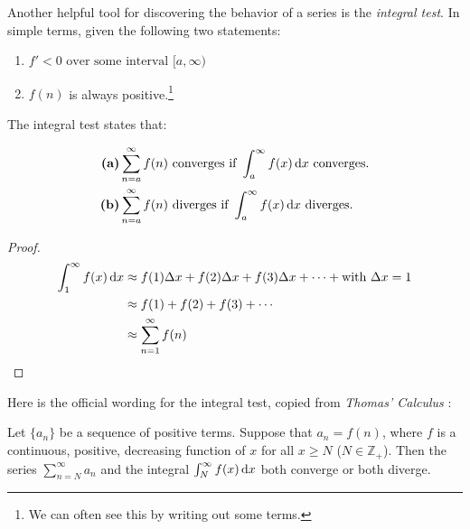 Another helpful tool for discovering the behavior of a series is the
\emph{integral test}.
In simple terms, given the following two statements:
\begin{enumerate}
  \item \(f' < 0 \text{ over some interval } [a, \infty) \)
    \item \(f(n)\) is always positive.\footnote{We can often see this by writing out some terms.}
\end{enumerate}
The integral test states that:

\begin{align*}
  \text{\textbf{(a)}} & \sum^\infty_{n=a} f(n) \text{ converges if }
  \int_{a}^{\infty} f(x) \,\mathrm{d} x \text{ converges.}  \\
  \text{\textbf{(b)}} & \sum^\infty_{n=a} f(n) \text{ diverges if } \int_{a}^{\infty} f(x) \,\mathrm{d} x \text{ diverges.}
\end{align*}

\begin{proof}
  \begin{align*}
    \int^\infty_1 f(x) \,\mathrm{d} x
    &\approx f(1) \Delta x + f(2) \Delta x + f(3) \Delta x + \cdots + \text{with } \Delta x = 1 \\
    &\approx f(1) + f(2)+f(3)+\cdots \\
    &\approx \sum^\infty_{n=1} f(n)\qedhere
  \end{align*}
\end{proof}

Here is the official wording for the integral test, copied from \emph{Thomas' Calculus} \cite[p.~554]{thomas}:
\begin{theorem}\label{th:seriesint}
  Let $\{a_n\}$ be a sequence of positive terms. Suppose that $a_n = f(n)$,
  where $f$ is a continuous, positive, decreasing function of $x$ for all $x
  \geq N$ ($N \in \mathbb{Z_+}$). Then the series $\sum_{n=N}^\infty a_n$ and
  the integral $\int_N^\infty f(x)\,\mathrm{d} x$ both converge or both
  diverge.
\end{theorem}

